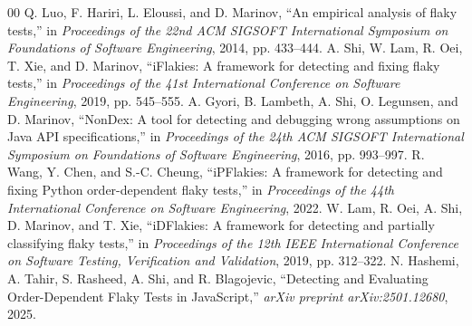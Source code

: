 \documentclass[10pt, conference]{IEEEtran}
\begin{document}
\begin{thebibliography}{00}
 Q. Luo, F. Hariri, L. Eloussi, and D. Marinov, ``An empirical analysis of flaky tests,'' in \emph{Proceedings of the 22nd ACM SIGSOFT International Symposium on Foundations of Software Engineering}, 2014, pp. 433--444.
 A. Shi, W. Lam, R. Oei, T. Xie, and D. Marinov, ``iFlakies: A framework for detecting and fixing flaky tests,'' in \emph{Proceedings of the 41st International Conference on Software Engineering}, 2019, pp. 545--555.
 A. Gyori, B. Lambeth, A. Shi, O. Legunsen, and D. Marinov, ``NonDex: A tool for detecting and debugging wrong assumptions on Java API specifications,'' in \emph{Proceedings of the 24th ACM SIGSOFT International Symposium on Foundations of Software Engineering}, 2016, pp. 993--997.
 R. Wang, Y. Chen, and S.-C. Cheung, ``iPFlakies: A framework for detecting and fixing Python order-dependent flaky tests,'' in \emph{Proceedings of the 44th International Conference on Software Engineering}, 2022.
 W. Lam, R. Oei, A. Shi, D. Marinov, and T. Xie, ``iDFlakies: A framework for detecting and partially classifying flaky tests,'' in \emph{Proceedings of the 12th IEEE International Conference on Software Testing, Verification and Validation}, 2019, pp. 312--322.
 N. Hashemi, A. Tahir, S. Rasheed, A. Shi, and R. Blagojevic, ``Detecting and Evaluating Order-Dependent Flaky Tests in JavaScript,'' \emph{arXiv preprint arXiv:2501.12680}, 2025.
\end{thebibliography}
\end{document}
